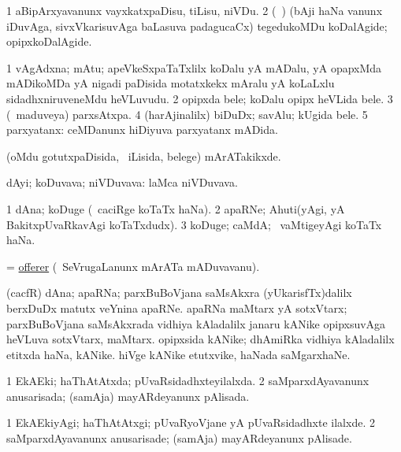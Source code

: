 \noindent
\gl{\pagu}
\bmng
\bnum
\num{1}  aBipArxyavanunx vayxkatxpaDisu, tiLisu, niVDu. 
\num{2}  (\saMkiSx\ ) (bAji haNa \mo vanunx iDuvAga, sivxVkarisuvAga baLasuva padagucaCx) tegedukoMDu koDalAgide; opipxkoDalAgide. 
\enum
\emng
\eentry

\bentry
{}
\gl{\nA}
\bmng
\bnum
\num{1} vAgAdxna; mAtu; apeVkeSxpaTaTxlilx koDalu yA mADalu, yA opapxMda mADikoMDa yA nigadi paDisida motatxkekx mAralu yA koLaLxlu sidadhxniruveneMdu heVLuvudu. 
\num{2} opipxda bele; koDalu opipx heVLida bele. 
\num{3} (\kanmu\ maduveya) parxsAtxpa. 
\num{4} (harAjinalilx) biDuDx; savAlu; kUgida bele. 
\num{5} parxyatanx:  ceMDanunx hiDiyuva parxyatanx mADida. 
\enum
\emng

\noindent
\gl{\pagu}
\bmng
{} (oMdu gotutxpaDisida, \kanmu\ iLisida, belege) mArATakikxde. 
\emng
\eentry

\bentry
{}
\gl{\nA}
\bmng
dAyi; koDuvava; niVDuvava:  laMca niVDuvava. 
\emng
\eentry

\bentry
{}
\gl{\nA}
\bmng
\bnum
\num{1} dAna; koDuge (\kanmu\ caciRge koTaTx haNa). 
\num{2} apaRNe; Ahuti(yAgi, yA BakitxpUvaRkavAgi koTaTxdudx). 
\num{3} koDuge; caMdA; \kanmu\ vaMtigeyAgi koTaTx haNa. 
\enum
\emng
\eentry

\bentry
{}
\gl{\nA}
\bmng
= \hyperlink{offerer}{offerer} (\kanmu\ SeVrugaLanunx mArATa mADuvavanu). 
\emng
\eentry

\bentry
{}
\gl{\nA}
\bmng
\bnum
{} (cacfR) 
\banum
{} dAna; apaRNa; parxBuBoVjana saMsAkxra (yUkarisfTx)dalilx berxDuDx matutx veYnina apaRNe. 
 apaRNa maMtarx yA sotxVtarx; parxBuBoVjana saMsAkxrada vidhiya kAladalilx janaru kANike opipxsuvAga heVLuva sotxVtarx, maMtarx. 
\eanum
\numie
{} 
\banum
{} opipxsida kANike; dhAmiRka vidhiya kAladalilx etitxda haNa, kANike. 
 hiVge kANike etutxvike, haNada saMgarxhaNe. 
\eanum
\numie
\enum
\emng
\eentry

\bentry
{}
\gl{\gu}
\bmng
\bnum
\num{1} EkAEki; haThAtAtxda; pUvaRsidadhxteyilalxda. 
\num{2} saMparxdAyavanunx anusarisada; (samAja) mayARdeyanunx pAlisada. 
\enum
\emng
\eentry

\bentry
{}
\gl{\kirxvi}
\bmng
\bnum
\num{1} EkAEkiyAgi; haThAtAtxgi; pUvaRyoVjane yA pUvaRsidadhxte ilalxde. 
\num{2} saMparxdAyavanunx anusarisade; (samAja) mayARdeyanunx pAlisade. 
\enum
\emng
\eentry

